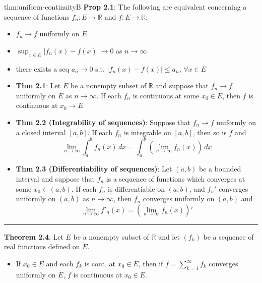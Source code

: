 \documentclass[landscape, 8pt]{extarticle}
\begin{document}
\begin{multicols}{3}
\begin{thm}{thm:uniform-continuity}{B}
	\textbf{Prop 2.1}: The following are equivalent concerning a sequence of functions $f_{n}:E\to \mathbb{R}$ and $f: E\to \mathbb{R}$:

		\begin{itemize}
			\setlength\itemsep{0em}
			\item $f_{n}\to f$ uniformly on $E$

			\item $\displaystyle\sup_{x\in E}\lvert f_{n}(x)-f(x) \rvert\to 0$ as $n\to\infty$

			\item there exists a seq $a_{n}\to 0$ s.t. $\lvert f_{n}(x)-f(x) \rvert\le a_{n},\, \forall x\in E$

		\end{itemize}


	\begin{itemize}[leftmargin=*]
	    \setlength\itemsep{0em}
			
		\item \textbf{Thm 2.1}: Let $E$ be a nonempty subset of $\mathbb{R}$ and suppose that $f_{n}\to f$ uniformly on $E$ as $n\to\infty$. If each $f_{n}$ is continuous at some $x_{0}\in E$, then $f$ is continuous at $x_{0}\to E$
		
		\item \textbf{Thm 2.2 (Integrability of sequences)}: Suppose that $f_{n}\to f$ uniformly on a closed interval $[a,b]$. If each $f_{n}$ is integrable on $[a,b]$, then so is $f$ and 
	\[\lim_{n \to \infty} \int_{a}^{b} f_{n}(x) \, dx =\int_{a}^{b} \left(\lim_{n \to \infty} f_{n}(x)\right) \, dx \]
		\item \textbf{Thm 2.3 (Differentiability of sequences)}: Let $(a,b)$ be a bounded interval and suppose that $f_{n}$ is a sequence of functions which converges at some $x_{0}\in(a,b)$. If each $f_{n}$ is differentiable on $(a,b)$, and $f_{n}'$ converges uniformly on $(a,b)$ as $n\to\infty$, then $f_{n}$ converges uniformly on $(a,b)$ and
			\vspace{-2pt}
			\[\lim_{n \to \infty} f'_{n}(x)=\left(\lim_{n \to \infty} f_{n}(x)\right)'\]
	\end{itemize}


	\noindent\rule{\textwidth}{0.2pt}
	\textbf{Theorem 2.4}: Let $E$ be a nonempty subset of $\mathbb{R}$ and let $(f_{k})$ be a sequence of real functions defined on $E$.

	\begin{itemize}
		\setlength\itemsep{0em}
		\item If $x_{0}\in E$ and each $f_{k}$ is cont. at $x_{0}\in E$, then if $f=\sum_{k=1}^{\infty}f_{k}$ converges uniformly on $E$, $f$ is continuous at $x_{0}\in E$.


\end{itemize}
\end{thm}
\end{multicols}
\end{document}
